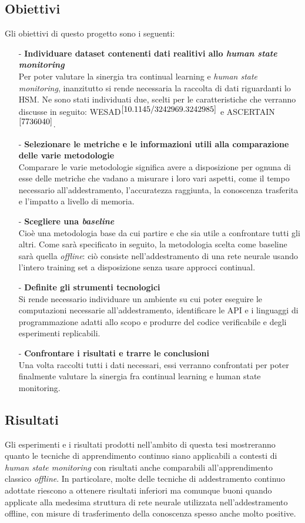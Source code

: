 \subsection*{Obiettivi}
Gli obiettivi di questo progetto sono i seguenti:
\begin{itemize}
    \item[-] \textbf{Individuare dataset contenenti dati realitivi allo \textit{human state monitoring}}\\
    Per poter valutare la sinergia tra continual learning e \textit{human state monitoring}, inanzitutto si rende necessaria la raccolta di dati riguardanti lo HSM. Ne sono stati individuati due, scelti per le caratteristiche che verranno discusse in seguito: WESAD$^{\cite{10.1145/3242969.3242985}}$ e ASCERTAIN$^{\cite{7736040}}$.
    \item[-] \textbf{Selezionare le metriche e le informazioni utili alla comparazione delle varie metodologie}\\
    Comparare le varie metodologie significa avere a disposizione per ognuna di esse delle metriche che vadano a misurare i loro vari aspetti, come il tempo necessario all'addestramento, l'accuratezza raggiunta, la conoscenza trasferita e l'impatto a livello di memoria.
    \item[-] \textbf{Scegliere una \textit{baseline}}\\
    Cioè una metodologia base da cui partire e che sia utile a confrontare tutti gli altri. Come sarà specificato in seguito, la metodologia scelta come baseline sarà quella \textit{offline}: ciò consiste nell'addestramento di una rete neurale usando l'intero training set a disposizione senza usare approcci continual.
    \item[-] \textbf{Definite gli strumenti tecnologici}\\
    Si rende necessario individuare un ambiente su cui poter eseguire le computazioni necessarie all'addestramento, identificare le API e i linguaggi di programmazione adatti allo scopo e produrre del codice verificabile e degli esperimenti replicabili.
    \item[-] \textbf{Confrontare i risultati e trarre le conclusioni}\\
    Una volta raccolti tutti i dati necessari, essi verranno confrontati per poter finalmente valutare la sinergia fra continual learning e human state monitoring.
\end{itemize}
\pagebreak
\subsection*{Risultati}
Gli esperimenti e i risultati prodotti nell'ambito di questa tesi mostreranno quanto le tecniche di apprendimento continuo siano applicabili a contesti di \textit{human state monitoring} con risultati anche comparabili all'apprendimento classico \textit{offline}. In particolare, molte delle tecniche di addestramento continuo adottate riescono a ottenere risultati inferiori ma comunque buoni quando applicate alla medesima struttura di rete neurale utilizzata nell'addestramento offline, con misure di trasferimento della conoscenza spesso anche molto positive.

